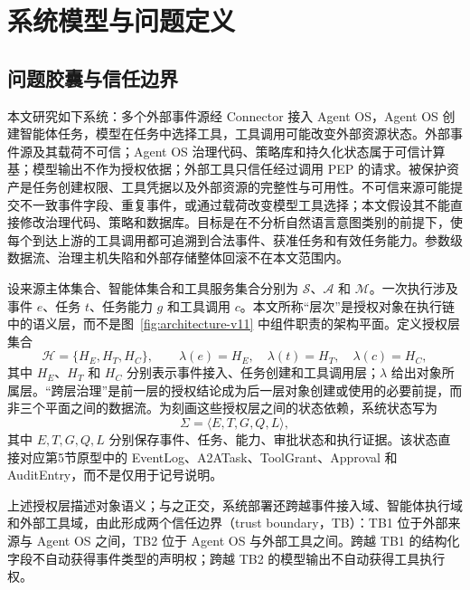 \section{系统模型与问题定义}\label{sec:problem-v11}

\subsection{问题胶囊与信任边界}

本文研究如下系统：多个外部事件源经 Connector 接入 Agent OS，Agent OS 创建智能体任务，模型在任务中选择工具，工具调用可能改变外部资源状态。外部事件源及其载荷不可信；Agent OS 治理代码、策略库和持久化状态属于可信计算基；模型输出不作为授权依据；外部工具只信任经过调用 PEP 的请求。被保护资产是任务创建权限、工具凭据以及外部资源的完整性与可用性。不可信来源可能提交不一致事件字段、重复事件，或通过载荷改变模型工具选择；本文假设其不能直接修改治理代码、策略和数据库。目标是在不分析自然语言意图类别的前提下，使每个到达上游的工具调用都可追溯到合法事件、获准任务和有效任务能力。参数级数据流、治理主机失陷和外部存储整体回滚不在本文范围内。

设来源主体集合、智能体集合和工具服务集合分别为 $\mathcal{S}$、$\mathcal{A}$ 和 $\mathcal{M}$。一次执行涉及事件 $e$、任务 $t$、任务能力 $g$ 和工具调用 $c$。本文所称“层次”是授权对象在执行链中的语义层，而不是图~\ref{fig:architecture-v11} 中组件职责的架构平面。定义授权层集合
\begin{equation}
\mathcal{H}=\{H_E,H_T,H_C\},\qquad
\lambda(e)=H_E,\quad \lambda(t)=H_T,\quad \lambda(c)=H_C,
\label{eq:authorization-layers-v11}
\end{equation}
其中 $H_E$、$H_T$ 和 $H_C$ 分别表示事件接入、任务创建和工具调用层；$\lambda$ 给出对象所属层。“跨层治理”是前一层的授权结论成为后一层对象创建或使用的必要前提，而非三个平面之间的数据流。为刻画这些授权层之间的状态依赖，系统状态写为
\begin{equation}
\Sigma=\langle E,T,G,Q,L\rangle,
\label{eq:system-state-v11}
\end{equation}
其中 $E,T,G,Q,L$ 分别保存事件、任务、能力、审批状态和执行证据。该状态直接对应第5节原型中的 EventLog、A2ATask、ToolGrant、Approval 和 AuditEntry，而不是仅用于记号说明。

上述授权层描述对象语义；与之正交，系统部署还跨越事件接入域、智能体执行域和外部工具域，由此形成两个信任边界（trust boundary，TB）：TB1 位于外部来源与 Agent OS 之间，TB2 位于 Agent OS 与外部工具之间。跨越 TB1 的结构化字段不自动获得事件类型的声明权；跨越 TB2 的模型输出不自动获得工具执行权。

